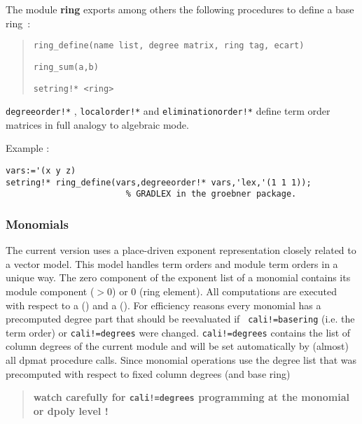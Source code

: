 The module {\bf ring} exports among others the following procedures
to define a base ring~:
\begin{quote}
\verb|ring_define(name list, degree matrix, ring tag, ecart)|


\verb|ring_sum(a,b)|


\verb|setring!* <ring> |

\end{quote}
\verb|degreeorder!*| , \verb|localorder!*| and  \verb|eliminationorder!*|
define term order matrices in full analogy to algebraic mode.
\medskip

\noindent Example :
\begin{verbatim}
vars:='(x y z)
setring!* ring_define(vars,degreeorder!* vars,'lex,'(1 1 1));   
                        % GRADLEX in the groebner package.
\end{verbatim}

\subsubsection*{Monomials}

The current version uses a place-driven exponent representation
closely related to a vector model. This model handles term orders and
module term orders in a unique way. The zero component of the
exponent list of a monomial contains its module component ($>0$) or 0
(ring element). All computations are executed with respect to a
 () and a 
(). For efficiency reasons every monomial has a
precomputed degree part that should be reevaluated if {\tt
cali!=basering} (i.e. the term order) or {\tt cali!=degrees} were
changed. {\tt cali!=degrees} contains the list of column degrees of
the current module and will be set automatically by (almost) all
dpmat procedure calls. Since monomial operations use the degree list
that was precomputed with respect to fixed column degrees (and base ring)
\begin{quote}\bf
watch carefully for {\tt cali!=degrees} programming at the monomial 
or dpoly level !
\end{quote}

